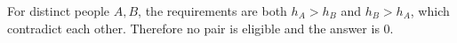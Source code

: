 For distinct people $A,B$, the requirements are both $h_A>h_B$ and $h_B>h_A$, which contradict each other. Therefore no pair is eligible and the answer is $\boxed0$.
